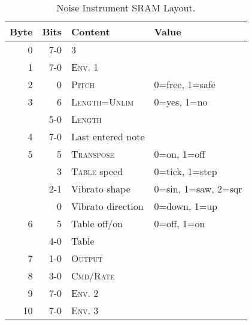 \begin{table}
	\begin{center}
		\caption{Noise Instrument SRAM Layout.}
		\label{tab:sram-noise}
		\begin{tabular}{r|r|l|l}
			\toprule
   Byte	& Bits	& Content 		& Value \\
\midrule
      0	& 7-0 	& 3 			& \\
      1 & 7-0 	& \textsc{Env. 1} 	& \\
      2 & 0   	& \textsc{Pitch} 	& 0=free, 1=safe \\
      3 & 6   	& \textsc{Length=Unlim}	& 0=yes, 1=no \\
        & 5-0 	& \textsc{Length} 	& \\
      4 & 7-0 	& Last entered note 	& \\
      5 & 5     & \textsc{Transpose} 	& 0=on, 1=off \\
	& 3     & \textsc{Table} speed	& 0=tick, 1=step \\
	& 2-1 	& Vibrato shape		& 0=sin, 1=saw, 2=sqr \\
	& 0   	& Vibrato direction	& 0=down, 1=up \\
      6	& 5   	& Table off/on		& 0=off, 1=on \\
	& 4-0 	& Table			& \\
      7 & 1-0 	& \textsc{Output}	& \\
      8 & 3-0 	& \textsc{Cmd/Rate}	& \\
      9 & 7-0 	& \textsc{Env. 2}	& \\
     10 & 7-0 	& \textsc{Env. 3}	& \\
     \bottomrule
		\end{tabular}
	\end{center}
\end{table}
